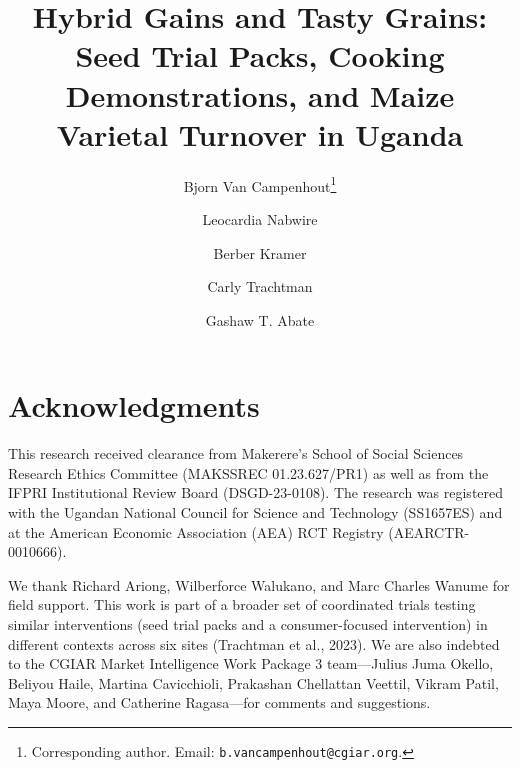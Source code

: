 \documentclass[12pt]{article}
\begin{document}

\title{\textbf{Hybrid Gains and Tasty Grains: Seed Trial Packs, Cooking
Demonstrations, and Maize Varietal Turnover in Uganda}}

\author[1]{Bjorn Van Campenhout\thanks{Corresponding author.
Email: \texttt{b.vancampenhout@cgiar.org}.}}
\author[2]{Leocardia Nabwire}
\author[3]{Berber Kramer}
\author[4]{Carly Trachtman}
\author[4]{Gashaw T. Abate}


\date{}
\maketitle

\vfill

\section*{Acknowledgments}

This research received clearance from Makerere's School of Social Sciences
Research Ethics Committee (MAKSSREC 01.23.627/PR1) as well as from the IFPRI
Institutional Review Board (DSGD-23-0108). The research was registered with the
Ugandan National Council for Science and Technology (SS1657ES) and at the
American Economic Association (AEA) RCT Registry (AEARCTR-0010666).

We thank Richard Ariong, Wilberforce Walukano, and Marc Charles Wanume for field
support. This work is part of a broader set of coordinated trials testing similar
interventions (seed trial packs and a consumer-focused intervention) in different
contexts across six sites (Trachtman et al., 2023). We are also indebted to the
CGIAR Market Intelligence Work Package 3 team---Julius Juma Okello, Beliyou Haile,
Martina Cavicchioli, Prakashan Chellattan Veettil, Vikram Patil, Maya Moore, and
Catherine Ragasa---for comments and suggestions.
\end{document}
